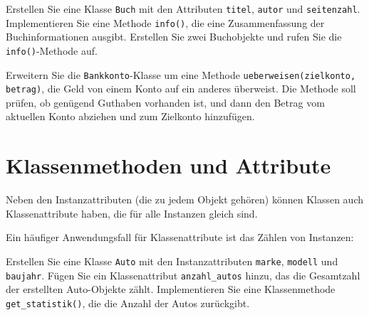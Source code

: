 \begin{myexercise}
    Erstellen Sie eine Klasse \lstinline|Buch| mit den Attributen \lstinline|titel|, \lstinline|autor| und \lstinline|seitenzahl|. Implementieren Sie eine Methode \lstinline|info()|, die eine Zusammenfassung der Buchinformationen ausgibt. Erstellen Sie zwei Buchobjekte und rufen Sie die \lstinline|info()|-Methode auf.

    \begin{myanswer}

    \end{myanswer}
\end{myexercise}

\begin{myexercise}
    Erweitern Sie die \lstinline|Bankkonto|-Klasse um eine Methode \lstinline|ueberweisen(zielkonto, betrag)|, die Geld von einem Konto auf ein anderes überweist. Die Methode soll prüfen, ob genügend Guthaben vorhanden ist, und dann den Betrag vom aktuellen Konto abziehen und zum Zielkonto hinzufügen.

    \begin{myanswer}

    \end{myanswer}
\end{myexercise}

\section{Klassenmethoden und Attribute}

Neben den Instanzattributen (die zu jedem Objekt gehören) können Klassen auch Klassenattribute haben, die für alle Instanzen gleich sind.

\begin{myexample}[Klassenattribute]

\end{myexample}

\begin{myexample}[Instanzzähler]
Ein häufiger Anwendungsfall für Klassenattribute ist das Zählen von Instanzen:


\end{myexample}

\begin{myexercise}
    Erstellen Sie eine Klasse \lstinline|Auto| mit den Instanzattributen \lstinline|marke|, \lstinline|modell| und \lstinline|baujahr|. Fügen Sie ein Klassenattribut \lstinline|anzahl_autos| hinzu, das die Gesamtzahl der erstellten Auto-Objekte zählt. Implementieren Sie eine Klassenmethode \lstinline|get_statistik()|, die die Anzahl der Autos zurückgibt.

    \begin{myanswer}
        
    \end{myanswer}
\end{myexercise}

